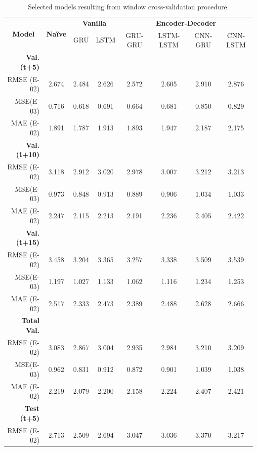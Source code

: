 \begin{table}[htbp]
  \centering
  \caption{Selected models resulting from window cross-validation procedure.}
    \begin{tabular}{r|c|cc|cccc}
    \multicolumn{1}{c|}{\multirow{2}[1]{*}{\textbf{Model}}} & \multirow{2}[1]{*}{\textbf{Naïve}} & \multicolumn{2}{c|}{\textbf{Vanilla}} & \multicolumn{4}{c}{\textbf{Encoder-Decoder}} \\
      &   & GRU & LSTM & GRU-GRU & LSTM-LSTM & CNN-GRU & CNN-LSTM \\
    \midrule
    \textbf{Val. (t+5)} &   &   &   &   &   &   &  \\
    RMSE (E-02) & 2.674 & 2.484 & 2.626 & 2.572 & 2.605 & 2.910 & 2.876 \\
    MSE(E-03) & 0.716 & 0.618 & 0.691 & 0.664 & 0.681 & 0.850 & 0.829 \\
    MAE (E-02) & 1.891 & 1.787 & 1.913 & 1.893 & 1.947 & 2.187 & 2.175 \\
    \textbf{Val. (t+10)} &   &   &   &   &   &   &  \\
    RMSE (E-02) & 3.118 & 2.912 & 3.020 & 2.978 & 3.007 & 3.212 & 3.213 \\
    MSE(E-03) & 0.973 & 0.848 & 0.913 & 0.889 & 0.906 & 1.034 & 1.033 \\
    MAE (E-02) & 2.247 & 2.115 & 2.213 & 2.191 & 2.236 & 2.405 & 2.422 \\
    \textbf{Val. (t+15)} &   &   &   &   &   &   &  \\
    RMSE (E-02) & 3.458 & 3.204 & 3.365 & 3.257 & 3.338 & 3.509 & 3.539 \\
    MSE(E-03) & 1.197 & 1.027 & 1.133 & 1.062 & 1.116 & 1.234 & 1.253 \\
    MAE (E-02) & 2.517 & 2.333 & 2.473 & 2.389 & 2.488 & 2.628 & 2.666 \\
    \midrule
    \textbf{Total Val.} &   &   &   &   &   &   &  \\
    RMSE (E-02) & 3.083 & 2.867 & 3.004 & 2.935 & 2.984 & 3.210 & 3.209 \\
    MSE(E-03) & 0.962 & 0.831 & 0.912 & 0.872 & 0.901 & 1.039 & 1.038 \\
    MAE (E-02) & 2.219 & 2.079 & 2.200 & 2.158 & 2.224 & 2.407 & 2.421 \\
    \midrule
    \textbf{Test (t+5)} &   &   &   &   &   &   &  \\
    RMSE (E-02) & 2.713 & 2.509 & 2.694 & 3.047 & 3.036 & 3.370 & 3.217 \\

\end{tabular}
\end{table}
